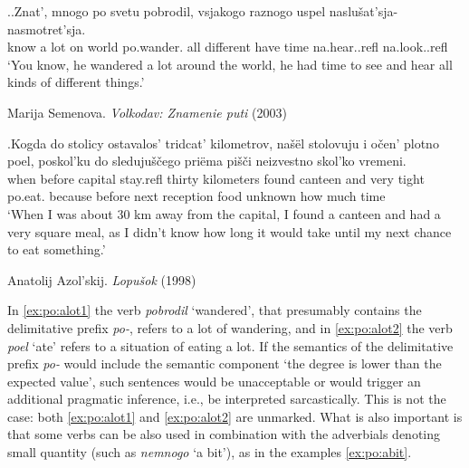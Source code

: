 \ex.\label{ex:po:alot}\ag.\label{ex:po:alot1}Znat', mnogo po svetu pobrodil, vsjakogo raznogo uspel {naslu\v{s}at'sja-} {nasmotret'sja.}\\
know {a lot} on world po.wander. all different {have time} na.hear..refl na.look..refl\\
\vspace{0.5em}
`You know, he wandered a lot around the world, he had time to see and hear all kinds of different things.'
\begin{flushright}
\vspace{-0.5em}
Marija Semenova. \textit{Volkodav: Znamenie puti} (2003)	
\end{flushright}
\bg.\label{ex:po:alot2}Kogda do stolicy ostavalos' tridcat' kilometrov, na\v{s}\"{e}l stolovuju i o\v{c}en' plotno poel, poskol'ku do sleduju\v{s}\v{c}ego pri\"{e}ma pi\v{s}\v{c}i neizvestno skol'ko vremeni.\\
when before capital stay.refl thirty kilometers found canteen and very tight po.eat. because before next reception food unknown {how much} time\\
\vspace{0.5em}
`When I was about 30 km away from the capital, I found a canteen and had a very square meal, as I didn't know how long it would take until my next chance to eat something.'
\begin{flushright}
\vspace{-0.5em}
Anatolij Azol'skij. \textit{Lopu\v{s}ok} (1998)
\end{flushright}

In \ref{ex:po:alot1} the verb \textit{pobrodil} `wandered', that presumably contains the delimitative prefix \textit{po-}, refers to a lot of wandering, and in \ref{ex:po:alot2} the verb \textit{poel} `ate' refers to a situation of eating a lot. If the semantics of the delimitative prefix \textit{po-} would include the semantic component `the degree is lower than the expected value', such sentences would be unacceptable or would trigger an additional pragmatic inference, i.e., be interpreted sarcastically. This is not the case: both \ref{ex:po:alot1} and \ref{ex:po:alot2} are unmarked. What is also important is that some verbs can be also used in combination with the adverbials denoting small quantity (such as \textit{nemnogo} `a bit'), as in the examples \ref{ex:po:abit}.

